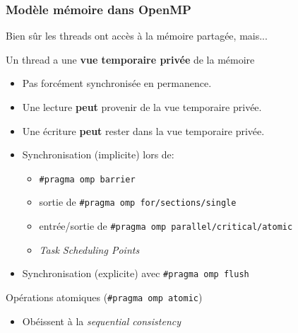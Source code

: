 \documentclass[xcolor={x11names,svgnames},x11names,svgnames]{beamer}
\begin{document}

\begin{frame}[label=omp_memory_model]
\frametitle{Modèle mémoire dans OpenMP}


Bien sûr les threads ont accès à la mémoire partagée, mais...


\begin{alertblock}{Un thread a une \textbf{vue temporaire privée} de la mémoire}
  \begin{itemize}
  \item Pas forcément synchronisée en permanence.

  \item Une lecture \textbf{peut} provenir de la vue temporaire privée.
    
  \item Une écriture \textbf{peut} rester dans la vue temporaire privée.

  \item Synchronisation (implicite) lors de:
    \begin{itemize}
    \item \texttt{\#pragma omp barrier}
    \item sortie de \texttt{\#pragma omp for/sections/single}
    \item entrée/sortie de \texttt{\#pragma omp parallel/critical/atomic}
    \item \emph{Task Scheduling Points}
    \end{itemize}

  \item Synchronisation (explicite) avec \texttt{\#pragma omp flush}
  \end{itemize}
\end{alertblock}

  \begin{exampleblock}{Opérations atomiques (\texttt{\#pragma omp atomic})}
    \begin{itemize}
    \item Obéissent à la \emph{sequential consistency}
    \end{itemize}
  \end{exampleblock}

\end{frame}
\end{document}
